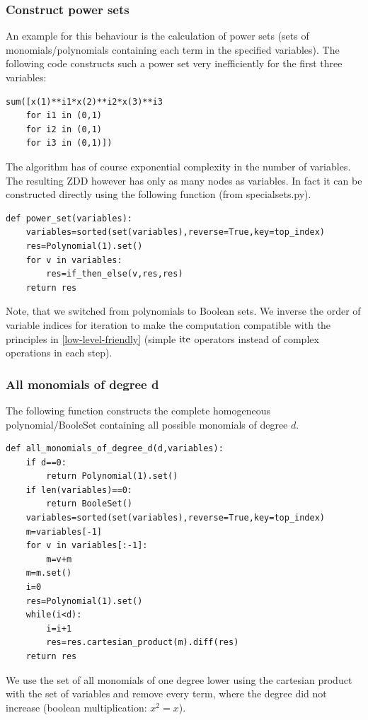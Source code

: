 \subsubsection{Construct power sets}
An example for this behaviour is the calculation of power sets (sets of monomials/polynomials containing each term in the specified variables).
The following code constructs such a power set very inefficiently for the first three variables:
\begin{lstlisting}
sum([x(1)**i1*x(2)**i2*x(3)**i3 
    for i1 in (0,1) 
    for i2 in (0,1) 
    for i3 in (0,1)])
\end{lstlisting}
The algorithm has of course exponential complexity in the number of variables.
The resulting ZDD however has only as many nodes as variables.
In fact it can be constructed directly using the following function (from specialsets.py).
\begin{lstlisting}
def power_set(variables):
    variables=sorted(set(variables),reverse=True,key=top_index)
    res=Polynomial(1).set()
    for v in variables:
        res=if_then_else(v,res,res)
    return res 
\end{lstlisting}
Note, that we switched from polynomials to Boolean sets. We inverse the order of variable indices for iteration to make the computation compatible with the principles in \ref{low-level-friendly} (simple $\operatorname{ite}$ operators instead of complex operations in each step).

\subsubsection{All monomials of degree d}
\label{all-monomials-set-operations}
The following function constructs the complete homogeneous polynomial/BooleSet containing all possible monomials of degree $d$.
\begin{lstlisting}
def all_monomials_of_degree_d(d,variables):
    if d==0:
        return Polynomial(1).set()
    if len(variables)==0:
        return BooleSet()
    variables=sorted(set(variables),reverse=True,key=top_index)
    m=variables[-1]
    for v in variables[:-1]:
        m=v+m
    m=m.set()
    i=0
    res=Polynomial(1).set()
    while(i<d):
        i=i+1
        res=res.cartesian_product(m).diff(res)
    return res
\end{lstlisting}
We use the set of all monomials of one degree lower using the cartesian product with the set of variables and remove every term, where the degree did not increase (boolean multiplication: $x^2=x$).
